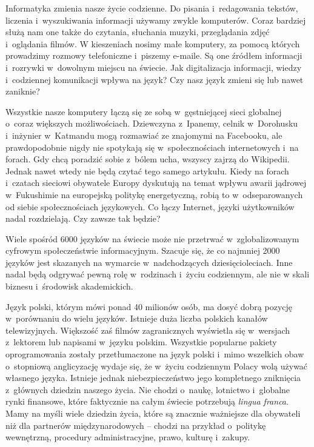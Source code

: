 \begin{multicols}{2} 

Informatyka zmienia nasze życie codzienne. Do pisania i~redagowania
tekstów, liczenia i~wyszukiwania informacji używamy zwykle
komputerów. Coraz bardziej służą nam one także do czytania,
słuchania muzyki, przeglądania zdjęć i~oglądania filmów. W kieszeniach nosimy małe komputery, za pomocą których prowadzimy rozmowy
telefoniczne i~piszemy e-maile. Są one źródłem informacji
i~rozrywki w~dowolnym miejscu na świecie. Jak digitalizacja
informacji, wiedzy i~codziennej komunikacji wpływa na język? Czy
nasz język zmieni się lub nawet zaniknie? 

Wszystkie nasze komputery łączą się ze sobą w~gęstniejącej
sieci globalnej o~coraz większych możliwościach. Dziewczyna
z~Ipanemy, celnik w~Dorohusku i~inżynier w~Katmandu mogą rozmawiać
ze znajomymi na Facebooku, ale prawdopodobnie nigdy nie spotykają się
w~społecznościach internetowych i~na forach. Gdy chcą poradzić
sobie z~bólem ucha, wszyscy zajrzą do Wikipedii. Jednak nawet wtedy
nie będą czytać tego samego artykułu. Kiedy na forach i~czatach
sieciowi obywatele Europy dyskutują na temat wpływu awarii jądrowej
w~Fukushimie na europejską politykę energetyczną, robią to
w~odseparowanych od siebie społecznościach językowych. Co łączy
Internet, języki użytkowników nadal rozdzielają. Czy zawsze tak
będzie? 

Wiele spośród 6000 języków na świecie może nie przetrwać
w~zglobalizowanym cyfrowym społeczeństwie informacyjnym. Szacuje
się, że co najmniej 2000 języków jest skazanych na wymarcie
w~nadchodzących dziesięcioleciach. Inne nadal będą odgrywać
pewną rolę w~rodzinach i~życiu codziennym, ale nie w skali biznesu 
i~środowisk akademickich. 


Język polski, którym mówi ponad 40 milionów osób, ma dosyć
dobrą pozycję w~porównaniu do wielu języków. Istnieje duża
liczba polskich kanałów telewizyjnych. Większość zaś filmów
zagranicznych wyświetla się w~wersjach z~lektorem lub napisami
w~języku polskim. Wszystkie popularne pakiety oprogramowania zostały
przetłumaczone na język polski i~mimo wszelkich obaw o~stopniową
anglicyzację wydaje się, że w~życiu codziennym Polacy wolą
używać własnego języka. Istnieje jednak niebezpieczeństwo jego
kompletnego zniknięcia z~głównych dziedzin naszego życia. Nie
chodzi o~naukę, lotnictwo i~globalne rynki finansowe, które
faktycznie na całym świecie potrzebują \textit{lingua franca}. Mamy
na myśli wiele dziedzin życia, które są znacznie ważniejsze dla
obywateli niż dla partnerów międzynarodowych -- chodzi na przykład
o~politykę wewnętrzną, procedury administracyjne, prawo, kulturę
i~zakupy. 


\end{multicols}

